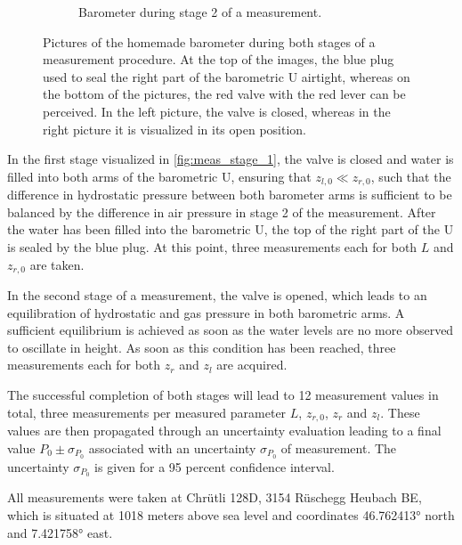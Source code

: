\documentclass[a4paper,11pt, twocolumn]{article}
\begin{document}
\begin{figure}[h!]
\begin{subfigure}{0.22\textwidth}
		\caption{Barometer during stage 2 of a measurement.}
		\label{fig:meas_stage_2}
	\end{subfigure}
	\caption{Pictures of the homemade barometer during both stages of a measurement procedure. At the top of the images, the blue plug used to seal the right part of the barometric U airtight, whereas on the bottom of the pictures, the red valve with the red lever can be perceived. In the left picture, the valve is closed, whereas in the right picture it is visualized in its open position.}
	\label{fig:measurement_procedure}
\end{figure}

In the first stage visualized in \cref{fig:meas_stage_1}, the valve is closed and water is filled into both arms of the barometric U, ensuring that $z_{l,0} \ll z_{r,0}$, such that the difference in hydrostatic pressure between both barometer arms is sufficient to be balanced by the difference in air pressure in stage 2 of the measurement. After the water has been filled into the barometric U, the top of the right part of the U is sealed by the blue plug. At this point, three measurements each for both $L$ and $z_{r,0}$ are taken.

In the second stage of a measurement, the valve is opened, which leads to an equilibration of hydrostatic and gas pressure in both barometric arms. A sufficient equilibrium is achieved as soon as the water levels are no more observed to oscillate in height. As soon as this condition has been reached, three measurements each for both $z_r$ and $z_l$ are acquired.

The successful completion of both stages will lead to 12 measurement values in total, three measurements per measured parameter $L$, $z_{r,0}$, $z_r$ and $z_l$. These values are then propagated through an uncertainty evaluation leading to a final value $P_0 \pm \sigma_{P_0}$ associated with an uncertainty $\sigma_{P_0}$ of measurement. The uncertainty $\sigma_{P_0}$ is given for a 95 percent confidence interval. 

All measurements were taken at Chrütli 128D, 3154 Rüschegg Heubach BE, which is situated at 1018 meters above sea level and coordinates \ang{46.762413} north and \ang{7.421758} east.
\end{document}

